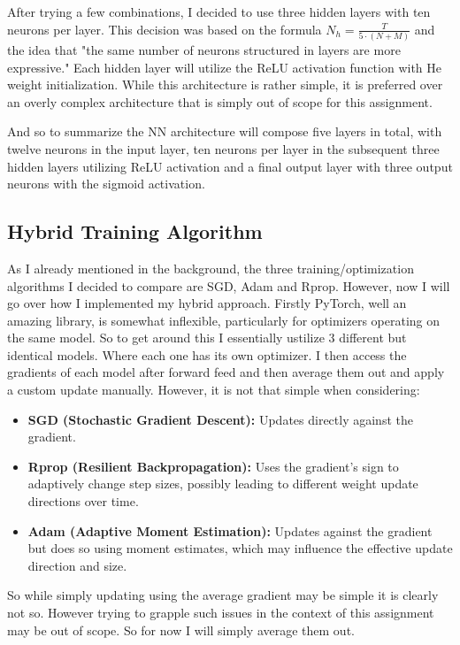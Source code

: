 \documentclass[conference]{IEEEtran}
\begin{document}
After trying a few combinations, I decided to use three hidden layers with ten neurons per layer. This decision was based on the formula \(N_h = \frac{T}{5 \cdot (N + M)}\) and the idea that "the same number of neurons structured in layers are more expressive." Each hidden layer will utilize the ReLU activation function with He weight initialization. While this architecture is rather simple, it is preferred over an overly complex architecture that is simply out of scope for this assignment. 

And so to summarize the NN architecture will compose five layers in total, with twelve neurons in the input layer, ten neurons per layer in the subsequent three hidden layers utilizing ReLU activation and a final output layer with three output neurons with the sigmoid activation.\\

\subsection{Hybrid Training Algorithm}
As I already mentioned in the background, the three training/optimization algorithms I decided to compare are SGD, Adam and Rprop. However, now I will go over how I implemented my hybrid approach. Firstly PyTorch, well an amazing library, is somewhat inflexible, particularly for optimizers operating on the same model. So to get around this I essentially ustilize 3 different but identical models. Where each one has its own optimizer. I then access the gradients of each model after forward feed and then average them out and apply a custom update manually.  However, it is not that simple when considering:

\begin{itemize}
    \item \textbf{SGD (Stochastic Gradient Descent):} Updates directly against the gradient.
    \item \textbf{Rprop (Resilient Backpropagation):} Uses the gradient's sign to adaptively change step sizes, possibly leading to different weight update directions over time.
    \item \textbf{Adam (Adaptive Moment Estimation):} Updates against the gradient but does so using moment estimates, which may influence the effective update direction and size.
\end{itemize}

So while simply updating using the average gradient may be simple it is clearly not so. However trying to grapple such issues in the context of this assignment may be out of scope. So for now I will simply average them out.
\end{document}
